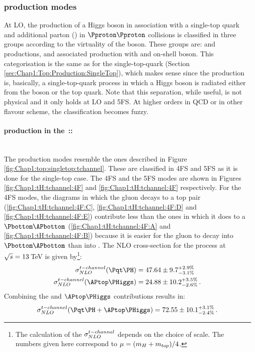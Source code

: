 \subsubsection{\tH production modes}
\label{sec:Chap1:tH:ProductionModes}
At LO, the production of a Higgs boson in association with a single-top quark and additional parton (\tHq) 
in $\Pproton \Pproton$ collisions is classified in three groups according 
to the virtuality of the \PW boson. These groups are: \tchannel and
\schannel productions, and associated production with and on-shell \PW boson. 
This categorisation is the same as for the single-top-quark (Section 
\ref{sec:Chap1:Top:Production:SingleTop}), which makes sense 
since the \tHq production is, basically, a single-top-quark process in which 
a Higgs boson is radiated either from the \PW boson or the top quark.
Note that this separation, while useful, is not physical and it only
holds at LO and 5FS. At higher orders in QCD or in other flavour
scheme, the classification becomes fuzzy.


\paragraph{\tH production in the \tchannel$\,$::$\,$\tHq}\mbox{}\\
The \tchannel production modes resemble the ones described in Figure \ref{fig:Chap1:top:singletop:tchannel}.
These are classified in 4FS and 5FS as it is done for the single-top case. 
The 4FS and the 5FS modes are shown in Figures \ref{fig:Chap1:tH:tchannel:4F} and \ref{fig:Chap1:tH:tchannel:4F} respectively. 
For the 4FS modes, the diagrams in which the gluon decays to a top pair (\ref{fig:Chap1:tH:tchannel:4F:C}, \ref{fig:Chap1:tH:tchannel:4F:D} and \ref{fig:Chap1:tH:tchannel:4F:E}) contribute less than the ones in which it does to a $\Pbottom\APbottom$ (\ref{fig:Chap1:tH:tchannel:4F:A} and \ref{fig:Chap1:tH:tchannel:4F:B}) because it is easier for the gluon to decay into  
$\Pbottom\APbottom$ than into \ttbar. The NLO cross-section for the \tHq process at $\sqrt{s}=13\,$TeV is 
given by\footnote{The calculation of the $\sigma_{NLO}^{t-channel}$ depends on the choice of scale. 
The numbers given here correspond to $\mu = (m_{H} + m_{top})/4$.}:
\begin{align}
	\sigma_{NLO}^{\tchannel} (\tH) & = 47.64\pm 9.7^{+2.9\%}_{-3.1\%}\\
	\sigma_{NLO}^{\tchannel} (\APtop\PHiggs) & = 24.88 \pm 10.2^{+3.5\%}_{-2.6\%} \, .
\end{align}
Combining the \tH and $\APtop\PHiggs$ contributions results in:
\begin{equation}
	\sigma_{NLO}^{\tchannel} (\tH + \APtop\PHiggs) = 72.55 \pm 10.1^{+3.1\%}_{-2.4\%}\,.
\end{equation}


